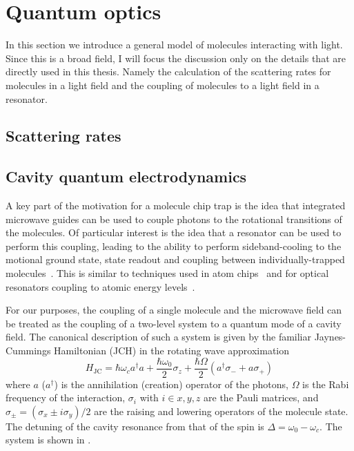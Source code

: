 \section{Quantum optics}
\label{theory:QO}

In this section we introduce a general model of molecules interacting with
light.  Since this is a broad field, I will focus the discussion only on the
details that are directly used in this thesis.  Namely the calculation of the
scattering rates for molecules in a light field and the coupling of molecules
to a light field in a resonator.


\subsection{Scattering rates}


\subsection{Cavity quantum electrodynamics}

A key part of the motivation for a molecule chip trap is the idea that
integrated microwave guides can be used to couple photons to the rotational
transitions of the molecules. Of particular interest is the idea
that a resonator can be used to perform this coupling, leading to the
ability to perform sideband-cooling to the motional ground state, state readout
and coupling between individually-trapped molecules~\cite{Andre2006}. This is
similar to techniques used in atom chips~\cite{Treutlein2008} and for optical
resonators coupling to atomic energy levels~\cite{SchleierSmith2011}.

For our purposes, the coupling of a single molecule and the microwave field can
be treated as the coupling of a two-level system to a quantum mode of a cavity
field. The canonical description of such a system is given by the familiar
Jaynes-Cummings Hamiltonian (JCH) in the rotating wave
approximation~\cite{gerry_knight_2004}
%
\begin{equation}
  H_\text{JC} = \hbar\omega_c a^\dagger a + \frac{\hbar \omega_0}{2} \sigma_z +
  \frac{\hbar\Omega}{2}(a^\dagger \sigma_- + a\sigma_+)
  \label{theory:eqn:JCH}
\end{equation}
%
where $a$ ($a^\dagger$) is the annihilation (creation) operator of the photons,
$\Omega$ is the Rabi frequency of the interaction, $\sigma_i$ with $i\in{x, y,
z}$ are the Pauli matrices, and $\sigma_\pm =
(\sigma_x \pm i\sigma_y)/2$ are the raising and lowering operators of the
molecule state. The
detuning of the cavity resonance from that of the spin is $\Delta = \omega_0 -
\omega_c$. The system is shown in .

